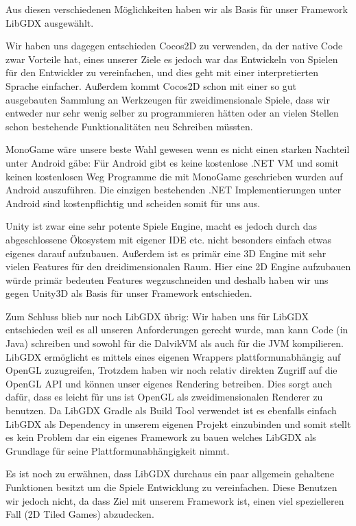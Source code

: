 Aus diesen verschiedenen Möglichkeiten haben wir als Basis für unser Framework LibGDX ausgewählt.

Wir haben uns dagegen entschieden Cocos2D zu verwenden, da der native Code zwar Vorteile hat, eines unserer Ziele es jedoch war das Entwickeln von Spielen für den Entwickler zu vereinfachen, und dies geht mit einer interpretierten Sprache einfacher. Außerdem kommt Cocos2D schon mit einer so gut ausgebauten Sammlung an Werkzeugen für zweidimensionale Spiele, dass wir entweder nur sehr wenig selber zu programmieren hätten oder an vielen Stellen schon bestehende Funktionalitäten neu Schreiben müssten.

MonoGame wäre unsere beste Wahl gewesen wenn es nicht einen starken Nachteil unter Android gäbe: Für Android gibt es keine kostenlose .NET VM und somit keinen kostenlosen Weg Programme die mit MonoGame geschrieben wurden auf Android auszuführen. Die einzigen bestehenden .NET Implementierungen unter Android sind kostenpflichtig und scheiden somit für uns aus.

Unity ist zwar eine sehr potente Spiele Engine, macht es jedoch durch das abgeschlossene Ökosystem mit eigener IDE etc. nicht besonders einfach etwas eigenes darauf aufzubauen. Außerdem ist es primär eine 3D Engine mit sehr vielen Features für den dreidimensionalen Raum. Hier eine 2D Engine aufzubauen würde primär bedeuten Features wegzuschneiden und deshalb haben wir uns gegen Unity3D als Basis für unser Framework entschieden.

Zum Schluss blieb nur noch LibGDX übrig:
Wir haben uns für LibGDX entschieden weil es all unseren Anforderungen gerecht wurde, man kann Code (in Java) schreiben und sowohl für die DalvikVM als auch für die JVM kompilieren. LibGDX ermöglicht es mittels eines eigenen Wrappers plattformunabhängig auf OpenGL zuzugreifen, Trotzdem haben wir noch relativ direkten Zugriff auf die OpenGL API und können unser eigenes Rendering betreiben. Dies sorgt auch dafür, dass es leicht für uns ist OpenGL als zweidimensionalen Renderer zu benutzen.
Da LibGDX Gradle als Build Tool verwendet ist es ebenfalls einfach LibGDX als Dependency in unserem eigenen Projekt einzubinden und somit stellt es kein Problem dar ein eigenes Framework zu bauen welches LibGDX als Grundlage für seine Plattformunabhängigkeit nimmt.

Es ist noch zu erwähnen, dass LibGDX durchaus ein paar allgemein gehaltene Funktionen besitzt um die Spiele Entwicklung zu vereinfachen. Diese Benutzen wir jedoch nicht, da dass Ziel mit unserem Framework ist, einen viel spezielleren Fall (2D Tiled Games) abzudecken.